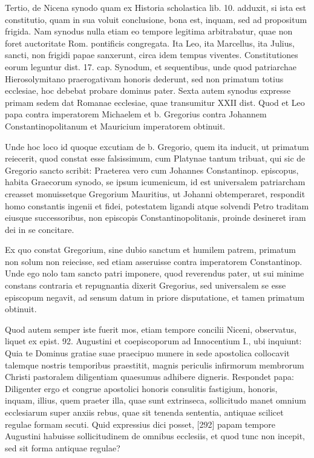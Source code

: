 Tertio, de Nicena synodo quam ex Historia scholastica lib. 10. adduxit, si ista est constitutio, quam in sua voluit conclusione, bona est, inquam, sed ad propositum frigida. Nam synodus nulla etiam eo tempore legitima arbitrabatur, quae non foret auctoritate Rom. pontificis congregata. Ita Leo, ita Marcellus, ita Julius, sancti, non frigidi papae sanxerunt, circa idem tempus viventes. Constitutiones eorum leguntur dist. 17. cap. Synodum, et sequentibus, unde quod patriarchae Hierosolymitano praerogativam honoris dederunt, sed non primatum totius ecclesiae, hoc debebat probare dominus pater. Sexta autem synodus expresse primam sedem dat Romanae ecclesiae, quae transumitur XXII dist. Quod et Leo papa contra imperatorem Michaelem et b. Gregorius contra Johannem Constantinopolitanum et Mauricium imperatorem obtinuit.

Unde hoc loco id quoque excutiam de b. Gregorio, quem ita inducit, ut primatum reiecerit, quod constat esse falsissimum, cum Platynae tantum tribuat, qui sic de Gregorio sancto scribit: Praeterea vero cum Johannes Constantinop. episcopus, habita Graecorum synodo, se ipsum icumenicum, id est universalem patriarcham creasset monuissetque Gregorium Mauritius, ut Johanni obtemperaret, respondit homo constantis ingenii et fidei, potestatem ligandi atque solvendi Petro traditam eiusque successoribus, non episcopis Constantinopolitanis, proinde desineret iram dei in se concitare.

Ex quo constat Gregorium, sine dubio sanctum et humilem patrem, primatum non solum non reiecisse, sed etiam asseruisse contra imperatorem Constantinop. Unde ego nolo tam sancto patri imponere, quod reverendus pater, ut sui minime constans contraria et repugnantia dixerit Gregorius, sed universalem se esse episcopum negavit, ad sensum datum in priore disputatione, et tamen primatum obtinuit.

Quod autem semper iste fuerit mos, etiam tempore concilii Niceni, observatus, liquet ex epist. 92. Augustini et coepiscoporum ad Innocentium I., ubi inquiunt: Quia te Dominus gratiae suae praecipuo munere in sede apostolica collocavit talemque nostris temporibus praestitit, magnis periculis infirmorum membrorum Christi pastoralem diligentiam quaesumus adhibere digneris. Respondet papa: Diligenter ergo et congrue apostolici honoris consulitis fastigium, honoris, inquam, illius, quem praeter illa, quae sunt extrinseca, sollicitudo manet omnium ecclesiarum super anxiis rebus, quae sit tenenda sententia, antiquae scilicet regulae formam secuti. Quid expressius dici posset, [292] papam tempore Augustini habuisse sollicitudinem de omnibus ecclesiis, et quod tunc non incepit, sed sit forma antiquae regulae?


